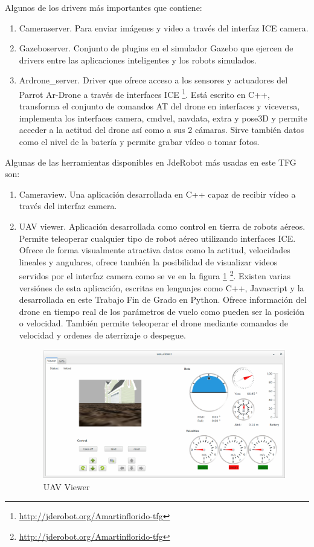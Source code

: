 Algunos de los drivers más importantes que contiene:
\begin{enumerate}
\item Cameraserver. Para enviar imágenes y video a través del interfaz ICE camera.
\item Gazeboserver. Conjunto de plugins en el simulador Gazebo que ejercen de drivers entre las aplicaciones inteligentes y los robots simulados.
\item Ardrone\_server. Driver que ofrece acceso a los sensores y actuadores del Parrot Ar-Drone a través de interfaces ICE \footnote{\url{http://jderobot.org/Amartinflorido-tfg}}. Está escrito en C++, transforma el conjunto de comandos AT del drone en interfaces y viceversa, implementa los interfaces camera, cmdvel, navdata, extra y pose3D y permite acceder a la actitud del drone así como a sus 2 cámaras. Sirve también datos como el nivel de la batería y permite grabar vídeo o tomar fotos.
\end{enumerate}
Algunas de las herramientas disponibles en JdeRobot más usadas en este TFG son:
\begin{enumerate}
\item Cameraview. Una aplicación desarrollada en C++ capaz de recibir vídeo a través del interfaz camera.
\item UAV viewer. Aplicación desarrollada como control en tierra de robots aéreos. Permite teleoperar cualquier tipo de robot aéreo utilizando interfaces ICE. Ofrece de forma visualmente atractiva datos como la actitud, velocidades lineales y angulares, ofrece también la posibilidad de visualizar videos servidos por el interfaz camera como se ve en la figura \ref{fig:uav_viewer_old} \footnote{\url{http://jderobot.org/Amartinflorido-tfg}}. Existen varias versiónes de esta aplicación, escritas en lenguajes como C++, Javascript y la desarrollada en este Trabajo Fin de Grado en Python. Ofrece información del drone en tiempo real de los parámetros de vuelo como pueden ser la posición o velocidad. También permite teleoperar el drone mediante comandos de velocidad y ordenes de aterrizaje o despegue.

\begin{figure}[H]
  \centering
  \includegraphics[scale=0.2]{imagenes/uav_viewer_old.png}
  \caption{UAV Viewer}
  \label{fig:uav_viewer_old}
\end{figure}
\end{enumerate}

